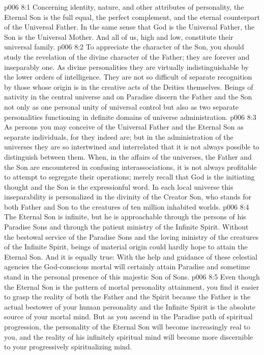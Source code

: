 \vs p006 8:1 Concerning identity, nature, and other attributes of personality, the Eternal Son is the full equal, the perfect complement, and the eternal counterpart of the Universal Father. In the same sense that God is the Universal Father, the Son is the Universal Mother. And all of us, high and low, constitute their universal family.
\vs p006 8:2 To appreciate the character of the Son, you should study the revelation of the divine character of the Father; they are forever and inseparably one. As divine personalities they are virtually indistinguishable by the lower orders of intelligence. They are not so difficult of separate recognition by those whose origin is in the creative acts of the Deities themselves. Beings of nativity in the central universe and on Paradise discern the Father and the Son not only as one personal unity of universal control but also as two separate personalities functioning in definite domains of universe administration.\plusone
\vs p006 8:3 As persons you may conceive of the Universal Father and the Eternal Son as separate individuals, for they indeed are; but in the administration of the universes they are so intertwined and interrelated that it is not always possible to distinguish between them. When, in the affairs of the universes, the Father and the Son are encountered in confusing interassociations, it is not always profitable to attempt to segregate their operations; merely recall that God is the initiating thought and the Son is the expressionful word. In each local universe this inseparability is personalized in the divinity of the Creator Son, who stands for both Father and Son to the creatures of ten million inhabited worlds.
\vs p006 8:4 The Eternal Son is infinite, but he is approachable through the persons of his Paradise Sons and through the patient ministry of the Infinite Spirit. Without the bestowal service of the Paradise Sons and the loving ministry of the creatures of the Infinite Spirit, beings of material origin could hardly hope to attain the Eternal Son. And it is equally true: With the help and guidance of these celestial agencies the God\hyp{}conscious mortal will certainly attain Paradise and sometime stand in the personal presence of this majestic Son of Sons.
\pc \vs p006 8:5 Even though the Eternal Son is the pattern of mortal personality attainment, you find it easier to grasp the reality of both the Father and the Spirit because the Father is the actual bestower of your human personality and the Infinite Spirit is the absolute source of your mortal mind. But as you ascend in the Paradise path of spiritual progression, the personality of the Eternal Son will become increasingly real to you, and the reality of his infinitely spiritual mind will become more discernible to your progressively spiritualizing mind.
